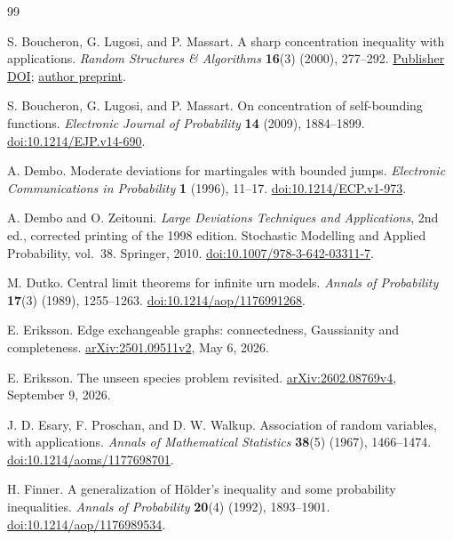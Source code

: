 \documentclass[11pt]{article}
\numberwithin{equation}{section}
\theoremstyle{definition}
\theoremstyle{remark}
\begin{document}
\clearpage
{}
{}
\begin{thebibliography}{99}

S. Boucheron, G. Lugosi, and P. Massart.
A sharp concentration inequality with applications.
\emph{Random Structures \& Algorithms} \textbf{16}(3) (2000), 277--292.
\href{https://doi.org/10.1002/(SICI)1098-2418(200005)16:3<277::AID-RSA4>3.0.CO;2-1}{Publisher DOI};
\href{https://econ-papers.upf.edu/papers/376.pdf}{author preprint}.

S. Boucheron, G. Lugosi, and P. Massart.
On concentration of self-bounding functions.
\emph{Electronic Journal of Probability} \textbf{14} (2009), 1884--1899.
\href{https://doi.org/10.1214/EJP.v14-690}{doi:10.1214/EJP.v14-690}.

A. Dembo.
Moderate deviations for martingales with bounded jumps.
\emph{Electronic Communications in Probability} \textbf{1} (1996), 11--17.
\href{https://doi.org/10.1214/ECP.v1-973}{doi:10.1214/ECP.v1-973}.

A. Dembo and O. Zeitouni.
\emph{Large Deviations Techniques and Applications}, 2nd ed.,
corrected printing of the 1998 edition.
Stochastic Modelling and Applied Probability, vol.~38. Springer, 2010.
\href{https://doi.org/10.1007/978-3-642-03311-7}{doi:10.1007/978-3-642-03311-7}.

M. Dutko.
Central limit theorems for infinite urn models.
\emph{Annals of Probability} \textbf{17}(3) (1989), 1255--1263.
\href{https://doi.org/10.1214/aop/1176991268}{doi:10.1214/aop/1176991268}.

E. Eriksson.
Edge exchangeable graphs: connectedness, Gaussianity and completeness.
\href{https://arxiv.org/abs/2501.09511v2}{arXiv:2501.09511v2}, May 6, 2026.

E. Eriksson.
The unseen species problem revisited.
\href{https://arxiv.org/abs/2602.08769v4}{arXiv:2602.08769v4}, September 9, 2026.

J. D. Esary, F. Proschan, and D. W. Walkup.
Association of random variables, with applications.
\emph{Annals of Mathematical Statistics} \textbf{38}(5) (1967), 1466--1474.
\href{https://doi.org/10.1214/aoms/1177698701}{doi:10.1214/aoms/1177698701}.

H. Finner.
A generalization of H\"older's inequality and some probability inequalities.
\emph{Annals of Probability} \textbf{20}(4) (1992), 1893--1901.
\href{https://doi.org/10.1214/aop/1176989534}{doi:10.1214/aop/1176989534}.


\end{thebibliography}
\end{document}
